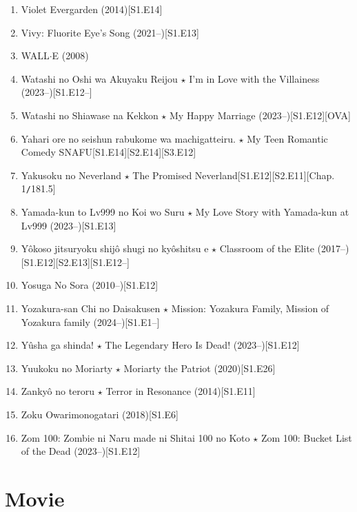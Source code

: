 \documentclass{article}
\begin{document}
\begin{enumerate}
    \item {\sc Violet Evergarden} (2014)\hfill[S1.E14]
    \item {\sc Vivy: Fluorite Eye's Song} (2021--)\hfill[S1.E13]
    \item {\sc WALL$\cdot$E} (2008)
    \item Watashi no Oshi wa Akuyaku Reijou $\star$ I'm in Love with the Villainess (2023--)\hfill[S1.E12--]
    \item {\sc Watashi no Shiawase na Kekkon $\star$ My Happy Marriage} (2023--)\hfill[S1.E12][OVA]
    \item {\sc Yahari ore no seishun rabukome wa machigatteiru. $\star$ My Teen Romantic Comedy SNAFU}\hfill[S1.E14][S2.E14][S3.E12]
    \item {\sc Yakusoku no Neverland $\star$ The Promised Neverland}\hfill[S1.E12][S2.E11][Chap. 1{\tt/}181.5]
    \item Yamada-kun to Lv999 no Koi wo Suru $\star$ My Love Story with Yamada-kun at Lv999 (2023--)\hfill[S1.E13]
    \item Yôkoso jitsuryoku shijô shugi no kyôshitsu e $\star$ Classroom of the Elite (2017--)\hfill[S1.E12][S2.E13][S1.E12--]
    \item {\sc Yosuga No Sora} (2010--)\hfill[S1.E12]
    \item Yozakura-san Chi no Daisakusen $\star$ Mission: Yozakura Family, Mission of Yozakura family (2024--)\hfill[S1.E1--]
    \item {\sc Yûsha ga shinda! $\star$ The Legendary Hero Is Dead!} (2023--)\hfill[S1.E12]
    \item {\sc Yuukoku no Moriarty $\star$ Moriarty the Patriot} (2020)\hfill[S1.E26]
    \item {\sc Zankyô no teroru $\star$ Terror in Resonance} (2014)\hfill[S1.E11]
    \item {\sc Zoku Owarimonogatari} (2018)[S1.E6]
    \item {\sc Zom 100: Zombie ni Naru made ni Shitai 100 no Koto $\star$ Zom 100: Bucket List of the Dead} (2023--)\hfill[S1.E12]
\end{enumerate}


\section{Movie}
\end{document}
